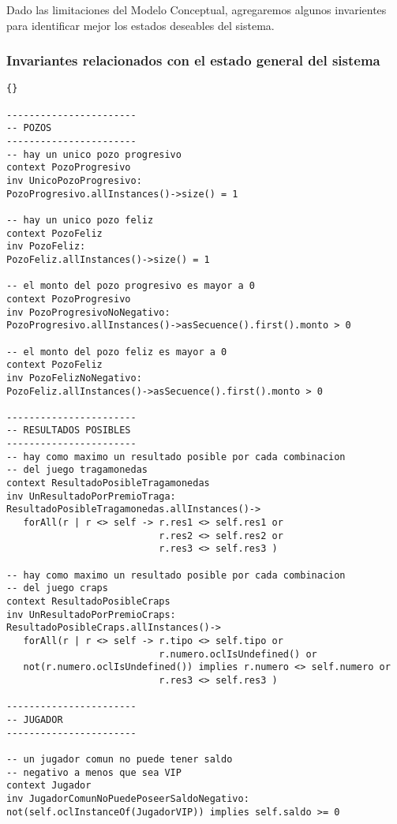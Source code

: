 
\begin{framed}
\depto Dado las limitaciones del Modelo Conceptual, agregaremos algunos invarientes para identificar mejor los estados deseables del sistema.

\subsubsection{Invariantes relacionados con el estado general del sistema}
\lstset{language=ocl}
\lstset{commentstyle=\textit}
\begin{lstlisting}[frame=trbl]{}

-----------------------
-- POZOS
-----------------------
-- hay un unico pozo progresivo
context PozoProgresivo
inv UnicoPozoProgresivo:
PozoProgresivo.allInstances()->size() = 1

-- hay un unico pozo feliz
context PozoFeliz
inv PozoFeliz:
PozoFeliz.allInstances()->size() = 1

-- el monto del pozo progresivo es mayor a 0
context PozoProgresivo
inv PozoProgresivoNoNegativo:
PozoProgresivo.allInstances()->asSecuence().first().monto > 0

-- el monto del pozo feliz es mayor a 0
context PozoFeliz
inv PozoFelizNoNegativo:
PozoFeliz.allInstances()->asSecuence().first().monto > 0

-----------------------
-- RESULTADOS POSIBLES
-----------------------
-- hay como maximo un resultado posible por cada combinacion 
-- del juego tragamonedas
context ResultadoPosibleTragamonedas
inv UnResultadoPorPremioTraga:
ResultadoPosibleTragamonedas.allInstances()->
   forAll(r | r <> self -> r.res1 <> self.res1 or
                           r.res2 <> self.res2 or
                           r.res3 <> self.res3 )

-- hay como maximo un resultado posible por cada combinacion 
-- del juego craps
context ResultadoPosibleCraps
inv UnResultadoPorPremioCraps:
ResultadoPosibleCraps.allInstances()->
   forAll(r | r <> self -> r.tipo <> self.tipo or
                           r.numero.oclIsUndefined() or
   not(r.numero.oclIsUndefined()) implies r.numero <> self.numero or
                           r.res3 <> self.res3 )

-----------------------
-- JUGADOR
-----------------------

-- un jugador comun no puede tener saldo 
-- negativo a menos que sea VIP
context Jugador
inv JugadorComunNoPuedePoseerSaldoNegativo:
not(self.oclInstanceOf(JugadorVIP)) implies self.saldo >= 0


\end{lstlisting}
\end{framed}
